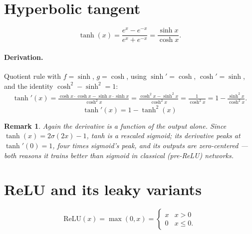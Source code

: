 \documentclass[11pt]{article}
\newtheorem{remark}{Remark}
\begin{document}
\section{Hyperbolic tangent}

\begin{equation}
  \tanh(x) = \frac{e^{x} - e^{-x}}{e^{x} + e^{-x}}
           = \frac{\sinh x}{\cosh x}.
  \label{eq:tanh}
\end{equation}

\paragraph{Derivation.} Quotient rule with $f = \sinh$, $g = \cosh$,
using $\sinh' = \cosh$, $\cosh' = \sinh$, and the identity
$\cosh^2 - \sinh^2 = 1$:
\begin{align*}
  \tanh'(x)
  = \frac{\cosh x \cdot \cosh x - \sinh x \cdot \sinh x}{\cosh^{2}x}
  = \frac{\cosh^2 x - \sinh^2 x}{\cosh^{2}x}
  = \frac{1}{\cosh^{2}x} = 1 - \frac{\sinh^2 x}{\cosh^2 x}.
\end{align*}
\begin{equation}
  \boxed{\;\tanh'(x) = 1 - \tanh^{2}(x)\;}
  \label{eq:tanhprime}
\end{equation}

\begin{remark}
Again the derivative is a function of the output alone. Since
$\tanh(x) = 2\sigma(2x) - 1$, tanh is a rescaled sigmoid; its
derivative peaks at $\tanh'(0) = 1$, four times sigmoid's peak, and its
outputs are zero-centered --- both reasons it trains better than
sigmoid in classical (pre-ReLU) networks.
\end{remark}

\section{ReLU and its leaky variants}

\begin{equation}
  \mathrm{ReLU}(x) = \max(0, x)
  = \begin{cases} x & x > 0\\ 0 & x \le 0. \end{cases}
  \label{eq:relu}
\end{equation}
\end{document}
